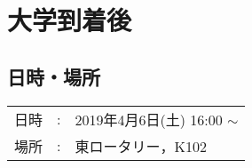 
%

\section{大学到着後}


\subsection{日時・場所}
\begin{tabular}{p{}rp{}}
  日時 & : & 2019年4月6日(土) 16:00 $\sim$ 	\\
  場所 & : & 東ロータリー，K102
\end{tabular}


